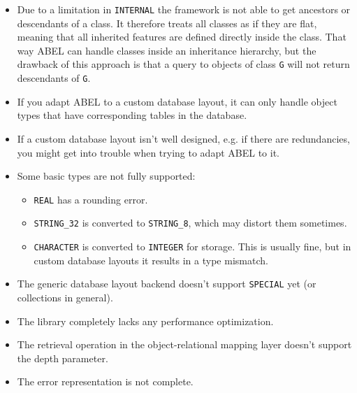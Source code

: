 \begin{itemize}
\item Due to a limitation in \lstinline!INTERNAL! the framework is not able to get ancestors or descendants of a class.
It therefore treats all classes as if they are flat, meaning that all inherited features are defined directly inside the class.
That way ABEL can handle classes inside an inheritance hierarchy, but the drawback of this approach is that a query to objects of class \lstinline!G! will not return descendants of \lstinline!G!.
\item If you adapt ABEL to a custom database layout, it can only handle object types that have corresponding tables in the database.
\item If a custom database layout isn't well designed, e.g. if there are redundancies, you might get into trouble when trying to adapt ABEL to it.
\item Some basic types are not fully supported:
\begin{itemize}
	\item \lstinline!REAL! has a rounding error.
	\item \lstinline!STRING_32! is converted to \lstinline!STRING_8!, which may distort them sometimes.
	\item \lstinline!CHARACTER! is converted to \lstinline!INTEGER! for storage.
	This is usually fine, but in custom database layouts it results in a type mismatch.
\end{itemize}
\item The generic database layout backend doesn't support \lstinline!SPECIAL! yet (or collections in general).
\item The library completely lacks any performance optimization.
\item The retrieval operation in the object-relational mapping layer doesn't support the depth parameter.
\item The error representation is not complete.
\end{itemize}

